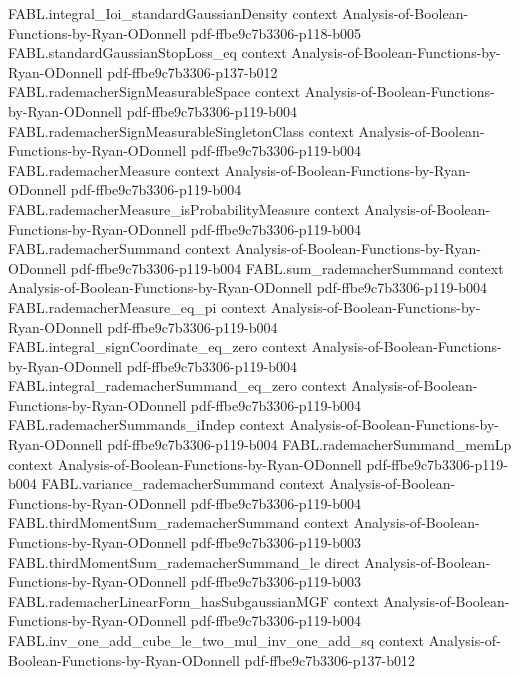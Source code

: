 \begin{theorem}
\proofstep
  {FABL.integral_Ioi_standardGaussianDensity}
  {context}
  {Analysis-of-Boolean-Functions-by-Ryan-ODonnell}
  {pdf-ffbe9c7b3306-p118-b005}
\proofstep
  {FABL.standardGaussianStopLoss_eq}
  {context}
  {Analysis-of-Boolean-Functions-by-Ryan-ODonnell}
  {pdf-ffbe9c7b3306-p137-b012}
\proofstep
  {FABL.rademacherSignMeasurableSpace}
  {context}
  {Analysis-of-Boolean-Functions-by-Ryan-ODonnell}
  {pdf-ffbe9c7b3306-p119-b004}
\proofstep
  {FABL.rademacherSignMeasurableSingletonClass}
  {context}
  {Analysis-of-Boolean-Functions-by-Ryan-ODonnell}
  {pdf-ffbe9c7b3306-p119-b004}
\proofstep
  {FABL.rademacherMeasure}
  {context}
  {Analysis-of-Boolean-Functions-by-Ryan-ODonnell}
  {pdf-ffbe9c7b3306-p119-b004}
\proofstep
  {FABL.rademacherMeasure_isProbabilityMeasure}
  {context}
  {Analysis-of-Boolean-Functions-by-Ryan-ODonnell}
  {pdf-ffbe9c7b3306-p119-b004}
\proofstep
  {FABL.rademacherSummand}
  {context}
  {Analysis-of-Boolean-Functions-by-Ryan-ODonnell}
  {pdf-ffbe9c7b3306-p119-b004}
\proofstep
  {FABL.sum_rademacherSummand}
  {context}
  {Analysis-of-Boolean-Functions-by-Ryan-ODonnell}
  {pdf-ffbe9c7b3306-p119-b004}
\proofstep
  {FABL.rademacherMeasure_eq_pi}
  {context}
  {Analysis-of-Boolean-Functions-by-Ryan-ODonnell}
  {pdf-ffbe9c7b3306-p119-b004}
\proofstep
  {FABL.integral_signCoordinate_eq_zero}
  {context}
  {Analysis-of-Boolean-Functions-by-Ryan-ODonnell}
  {pdf-ffbe9c7b3306-p119-b004}
\proofstep
  {FABL.integral_rademacherSummand_eq_zero}
  {context}
  {Analysis-of-Boolean-Functions-by-Ryan-ODonnell}
  {pdf-ffbe9c7b3306-p119-b004}
\proofstep
  {FABL.rademacherSummands_iIndep}
  {context}
  {Analysis-of-Boolean-Functions-by-Ryan-ODonnell}
  {pdf-ffbe9c7b3306-p119-b004}
\proofstep
  {FABL.rademacherSummand_memLp}
  {context}
  {Analysis-of-Boolean-Functions-by-Ryan-ODonnell}
  {pdf-ffbe9c7b3306-p119-b004}
\proofstep
  {FABL.variance_rademacherSummand}
  {context}
  {Analysis-of-Boolean-Functions-by-Ryan-ODonnell}
  {pdf-ffbe9c7b3306-p119-b004}
\proofstep
  {FABL.thirdMomentSum_rademacherSummand}
  {context}
  {Analysis-of-Boolean-Functions-by-Ryan-ODonnell}
  {pdf-ffbe9c7b3306-p119-b003}
\proofstep
  {FABL.thirdMomentSum_rademacherSummand_le}
  {direct}
  {Analysis-of-Boolean-Functions-by-Ryan-ODonnell}
  {pdf-ffbe9c7b3306-p119-b003}
\proofstep
  {FABL.rademacherLinearForm_hasSubgaussianMGF}
  {context}
  {Analysis-of-Boolean-Functions-by-Ryan-ODonnell}
  {pdf-ffbe9c7b3306-p119-b004}
\proofstep
  {FABL.inv_one_add_cube_le_two_mul_inv_one_add_sq}
  {context}
  {Analysis-of-Boolean-Functions-by-Ryan-ODonnell}
  {pdf-ffbe9c7b3306-p137-b012}

\end{theorem}
